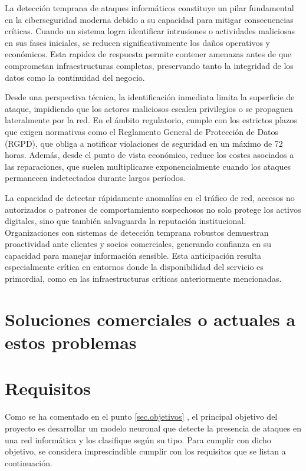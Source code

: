 La detección temprana de ataques informáticos constituye un pilar fundamental en la ciberseguridad moderna debido a su capacidad para mitigar consecuencias críticas. Cuando un sistema logra identificar intrusiones o actividades maliciosas en sus fases iniciales, se reducen significativamente los daños operativos y económicos. Esta rapidez de respuesta permite contener amenazas antes de que comprometan infraestructuras completas, preservando tanto la integridad de los datos como la continuidad del negocio.

Desde una perspectiva técnica, la identificación inmediata limita la superficie de ataque, impidiendo que los actores maliciosos escalen privilegios o se propaguen lateralmente por la red. En el ámbito regulatorio, cumple con los estrictos plazos que exigen normativas como el Reglamento General de Protección de Datos (RGPD), que obliga a notificar violaciones de seguridad en un máximo de 72 horas. Además, desde el punto de vista económico, reduce los costes asociados a las reparaciones, que suelen multiplicarse exponencialmente cuando los ataques permanecen indetectados durante largos períodos.


La capacidad de detectar rápidamente anomalías en el tráfico de red, accesos no autorizados o patrones de comportamiento sospechosos no solo protege los activos digitales, sino que también salvaguarda la reputación institucional. Organizaciones con sistemas de detección temprana robustos demuestran proactividad ante clientes y socios comerciales, generando confianza en su capacidad para manejar información sensible. Esta anticipación resulta especialmente crítica en entornos donde la disponibilidad del servicio es primordial, como en las infraestructuras críticas anteriormente mencionadas.

\section{Soluciones comerciales o actuales a estos problemas}


\section{Requisitos}  \label{sec.requisitos} 
Como se ha comentado en el punto \ref{sec.objetivos} , 
el principal objetivo del proyecto es desarrollar un modelo neuronal que detecte la presencia de ataques en una red informática y los clasifique según su tipo. Para cumplir con dicho objetivo, se considera imprescindible cumplir con los requisitos que se listan a continuación.

